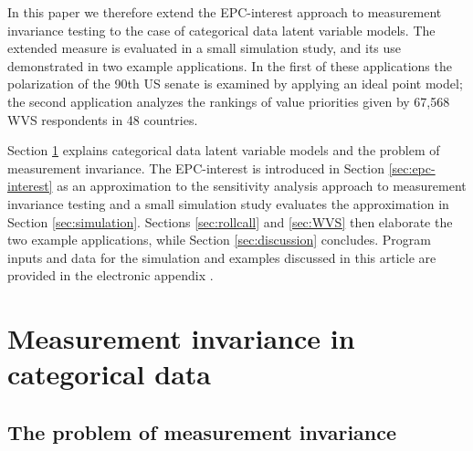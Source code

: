 \documentclass[letterpaper,12pt]{article}
\begin{document}

In this paper we therefore extend the EPC-interest approach to measurement invariance testing  to  the case of categorical data latent variable models. The extended measure is evaluated in a small simulation study, and its use demonstrated in two example applications. In the first of these applications the polarization of the 90th US senate is examined by applying an ideal point model; the second application analyzes the rankings of value priorities given by 67,568 WVS respondents in 48 countries. 


\bigskip
Section \ref{sec:invariance} explains categorical data latent variable models  and the problem of measurement invariance. The EPC-interest is introduced in Section \ref{sec:epc-interest} as an approximation to the sensitivity analysis approach to measurement invariance testing and a small simulation study evaluates the approximation in Section \ref{sec:simulation}. Sections \ref{sec:rollcall} and \ref{sec:WVS} then elaborate the two example applications, while Section \ref{sec:discussion} concludes. 
Program inputs and data for the simulation and examples discussed in this article are provided in the electronic appendix \citep{oberski2015replication}.


\section{Measurement invariance in categorical data}
\label{sec:invariance}
\subsection{The problem of measurement invariance}
\end{document}
